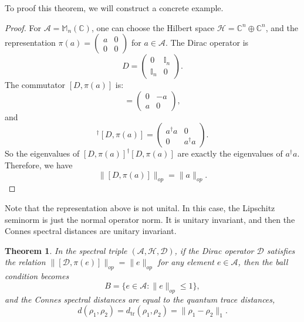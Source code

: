 \documentclass[a4paper,12pt]{article}
\newtheorem{theorem}{Theorem}
\begin{document}
To proof this theorem, we will construct a concrete example.

\begin{proof}
For $\mathcal{A}=\mathbb{M}_n (\mathbb{C})$, one can
choose the Hilbert space $\mathcal{H}=\mathbb{C}^n \oplus \mathbb{C}^n$, and
the representation $\pi (a) = \left( \begin{array}{cc}
  a & 0\\
  0 & 0
\end{array} \right)$ for $a \in \mathcal{A}$. The Dirac operator is
\begin{equation}
  D = \left( \begin{array}{cc}
    0 & \mathbb{I}_n\\
    \mathbb{I}_n & 0
  \end{array} \right) .
\end{equation}
The commutator $[D, \pi (a)]$ is:
\begin{equation}
  [D, \pi (a)] = \left( \begin{array}{cc}
    0 & - a\\
    a & 0
  \end{array} \right),
\end{equation}
and
\begin{equation}
  [D, \pi (a)]^{\dag} [D, \pi (a)] = \left( \begin{array}{cc}
    a^{\dag} a & 0\\
    0 & a^{\dag} a
  \end{array} \right) .
\end{equation}
So the eigenvalues of $[D, \pi (a)]^{\dag} [D, \pi (a)]$ are exactly the
eigenvalues of $a^{\dag} a$. Therefore, we have
\begin{equation}
  \|[D, \pi (a)]\|_{op} = \|a\|_{op} .
\end{equation}
\end{proof}

Note that the representation above is not unital. In this case,
the Lipschitz seminorm is just the normal operator norm. It is unitary invariant, and then the Connes spectral distances are unitary invariant.

\begin{theorem}
  \label{t6}In the spectral triple $(\mathcal{A}, \mathcal{H}, \mathcal{D})$,
  if the Dirac operator $\mathcal{D}$ satisfies the relation $\|[\mathcal{D},
  \pi (e)]\|_{op} = \|e\|_{op}$ for any element $e \in \mathcal{A}$, then the
  ball condition becomes
  \begin{equation}
    B = \{e \in \mathcal{A}: \|e\|_{op} \leqslant 1\},
  \end{equation}
  and the Connes spectral distances are equal to the quantum trace distances,
  \begin{equation}
    d (\rho_1, \rho_2) = d_{\mathrm{tr}} (\rho_1, \rho_2) = \| \rho_1 - \rho_2
    \|_1 .
  \end{equation}
\end{theorem}
\end{document}
